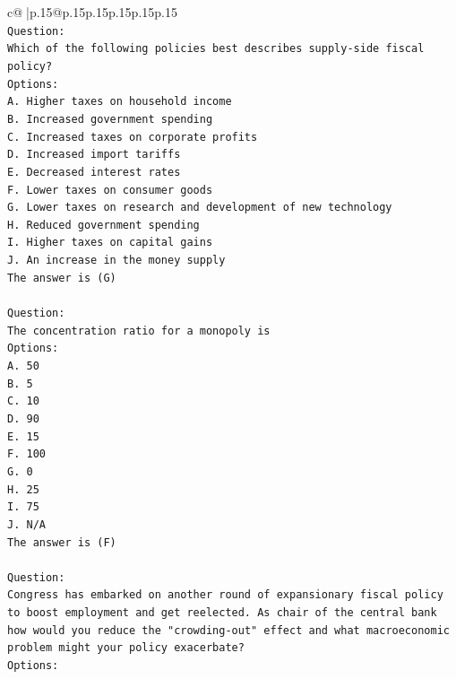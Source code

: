 \documentclass{article}
\begin{document}
{\begin{supertabular}{c@{$\;$}|p{.15\linewidth}@{}p{.15\linewidth}p{.15\linewidth}p{.15\linewidth}p{.15\linewidth}p{.15\linewidth}}
{{{\\ 
\texttt{Question:} \\
\texttt{Which of the following policies best describes supply{-}side fiscal policy?} \\
\texttt{Options:} \\
\texttt{A. Higher taxes on household income} \\
\texttt{B. Increased government spending} \\
\texttt{C. Increased taxes on corporate profits} \\
\texttt{D. Increased import tariffs} \\
\texttt{E. Decreased interest rates} \\
\texttt{F. Lower taxes on consumer goods} \\
\texttt{G. Lower taxes on research and development of new technology} \\
\texttt{H. Reduced government spending} \\
\texttt{I. Higher taxes on capital gains} \\
\texttt{J. An increase in the money supply} \\
\texttt{The answer is (G)} \\
\\ 
\texttt{Question:} \\
\texttt{The concentration ratio for a monopoly is} \\
\texttt{Options:} \\
\texttt{A. 50} \\
\texttt{B. 5} \\
\texttt{C. 10} \\
\texttt{D. 90} \\
\texttt{E. 15} \\
\texttt{F. 100} \\
\texttt{G. 0} \\
\texttt{H. 25} \\
\texttt{I. 75} \\
\texttt{J. N/A} \\
\texttt{The answer is (F)} \\
\\ 
\texttt{Question:} \\
\texttt{Congress has embarked on another round of expansionary fiscal policy to boost employment and get reelected. As chair of the central bank how would you reduce the "crowding{-}out" effect and what macroeconomic problem might your policy exacerbate?} \\
\texttt{Options:} \\
}}}
\end{supertabular}}
\end{document}
